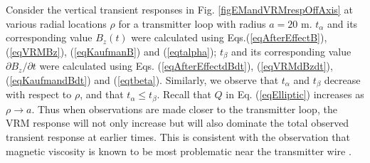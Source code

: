 \documentclass[onecolumn]{IEEEtran} %
\begin{document}
Consider the vertical transient responses in Fig. \ref{figEMandVRMrespOffAxis} at various radial locations $\rho$ for a transmitter loop with radius $a=20$ m. $t_{\alpha}$ and its corresponding value $B_z(t)$ were calculated using Eqs.(\ref{eqAfterEffectB}), (\ref{eqVRMBz}), (\ref{eqKaufmanB}) and (\ref{eqtalpha}); $t_{\beta}$ and its corresponding value $\partial B_z/\partial t$ were calculated using Eqs. (\ref{eqAfterEffectdBdt}), (\ref{eqVRMdBzdt}), (\ref{eqKaufmandBdt}) and (\ref{eqtbeta}). Similarly, we observe that $t_\alpha$ and $t_\beta$ decrease with respect to $\rho$, and that $t_\alpha \leq t_\beta$. Recall that $Q$ in Eq. (\ref{eqElliptic}) increases as $\rho \rightarrow a$. Thus when observations are made closer to the transmitter loop, the VRM response will not only increase but will also dominate the total observed transient response at earlier times. This is consistent with the observation that magnetic viscosity is known to be most problematic near the transmitter wire \cite{Buselli1982,Lee1984,Barsukov2001}.
\end{document}

